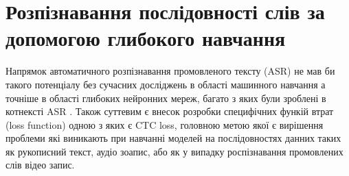 \section{Розпізнавання послідовності слів за допомогою глибокого навчання}

Напрямок автоматичного розпізнавання промовленого тексту (ASR) не мав би такого потенціалу без сучасних досліджень
в області машинного навчання а точніше в області глибоких нейронних мереж, багато з яких були зроблені в котнексті ASR
\cite{graves2006connectionist,dahl2012context,hinton2012deep}.
Також суттевим є внесок розробки специфічних функій втрат (loss function) одною з яких є CTC loss, головною метою якої
є вирішення проблеми які виникають при навчанні моделей на послідовностях данних таких як рукописний текст, 
аудіо зоапис, або як у випадку роспізнавання промовлених слів відео запис.




\begin{comment}

LipNet is the first end-to-end model that performs sentence-level sequence prediction for visual speech recogntion. That is, we 
demonstrate the first work that takes as input as sequence of images and outputs a distribution over sequences of tokens; it is 
trained end-to-end using CTC and thus also does not require alignments.
\end{comment}